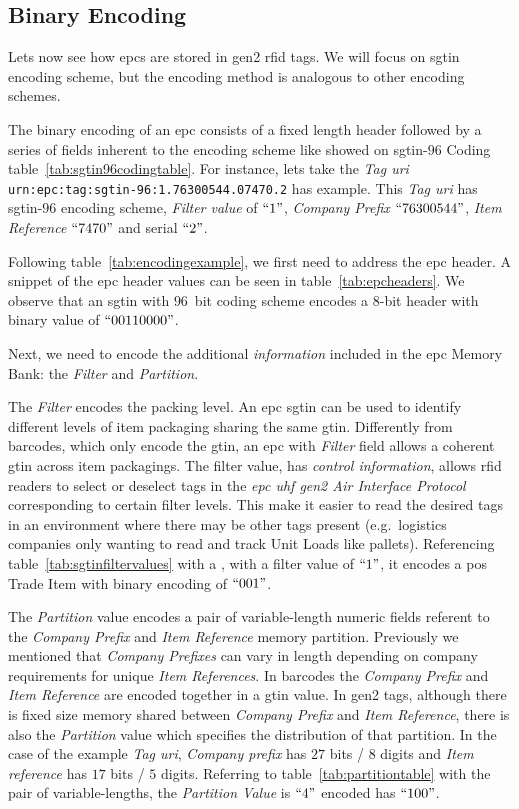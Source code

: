 \subsection{Binary Encoding} \label{sec:binencoding}

Lets now see how \acp{epc} are stored in \ac{gen2} \ac{rfid} tags.
We will focus on \ac{sgtin} encoding scheme, but the encoding method is analogous to other encoding schemes.

The binary encoding of an \ac{epc} consists of a fixed length header followed by a series of fields inherent to the encoding scheme like showed on \ac{sgtin}-$96$ Coding table~\ref{tab:sgtin96codingtable}.
For instance, lets take the \emph{Tag \ac{uri}}
\texttt{urn:epc:tag:sgtin-96:1.76300544.07470.2}
has example.
This \emph{Tag \ac{uri}} has \ac{sgtin}-$96$ encoding scheme, \emph{Filter value} of $``1"$, \emph{Company Prefix} $``76300544"$, \emph{Item Reference} $``7470"$ and serial $``2"$.

Following table~\ref{tab:encodingexample}, we first need to address the \ac{epc} header.
A snippet of the \ac{epc} header values can be seen in table~\ref{tab:epcheaders}. We observe that an \ac{sgtin} with $96$~bit coding scheme encodes a $8$-bit header with binary value of $``00110000"$.

Next, we need to encode the additional \textit{information} included in the \ac{epc} Memory Bank: the \emph{Filter} and \emph{Partition}. 

The \emph{Filter} encodes the packing level. An \ac{epc} \ac{sgtin} can be used to identify different levels of item packaging sharing the same \ac{gtin}. Differently from barcodes, which only encode the \ac{gtin}, an \ac{epc} with \emph{Filter} field allows a coherent \ac{gtin} across item packagings.
The filter value, has \textit{control information}, allows \ac{rfid} readers to select or deselect tags in the \emph{\ac{epc} \ac{uhf} \ac{gen2} Air Interface Protocol} corresponding to certain filter levels. This make it easier to read the desired tags in an environment where there may be other tags present (e.g.\ logistics companies only wanting to read and track Unit Loads like pallets).
Referencing table~\ref{tab:sgtinfiltervalues} with a , with a filter value of $``1"$, it encodes a \ac{pos} Trade Item with binary encoding of $``001"$.

The \emph{Partition} value encodes a pair of variable-length numeric fields referent to the \emph{Company Prefix} and \emph{Item Reference} memory partition. Previously we mentioned that \emph{Company Prefixes} can vary in length depending on company requirements for unique \emph{Item References}. 
In barcodes the \emph{Company Prefix} and \emph{Item Reference} are encoded together in a \ac{gtin} value. 
In \ac{gen2} tags, although there is fixed size memory shared between \emph{Company Prefix} and \emph{Item Reference}, there is also the \emph{Partition} value which specifies the distribution of that partition.
In the case of the example \emph{Tag \ac{uri}}, \emph{Company prefix} has $27$ bits / $8$ digits and \emph{Item reference} has $17$ bits / $5$ digits. Referring to table~\ref{tab:partitiontable} with the pair of variable-lengths, the \emph{Partition Value} is $``4"$ encoded has $``100"$.

